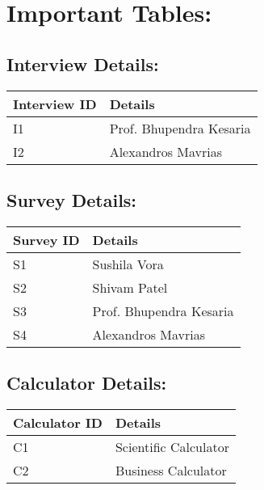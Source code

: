 \documentclass{article}
\begin{document}
\section{Important Tables:}

\subsection{Interview Details:}
\begin{table}[h!]
    \begin{tabular}{|| l|| l ||}
        \hline
         Interview ID & Details  \\
         \hline
         I1 & Prof. Bhupendra Kesaria \\
         \hline
         I2 & Alexandros Mavrias \\
         \hline
    \end{tabular}
\end{table}
\subsection{Survey Details:}
\begin{table}[h!]
    \begin{tabular}{|| l || l || }
        \hline
        Survey ID & Details \\
        \hline
        S1 & Sushila Vora \\ 
        \hline
        S2 & Shivam Patel \\ 
        \hline
        S3 & Prof. Bhupendra Kesaria \\ 
        \hline
        S4 & Alexandros Mavrias \\ 
        \hline
    \end{tabular}
\end{table}
\subsection{Calculator Details:}
\begin{table}[h!]
    \begin{tabular}{|| l || l || }
        \hline
        Calculator ID & Details \\
        \hline
        C1 & Scientific Calculator \\ 
        \hline
        C2 & Business Calculator \\ 
        \hline
    \end{tabular}
\end{table}
\end{document}
